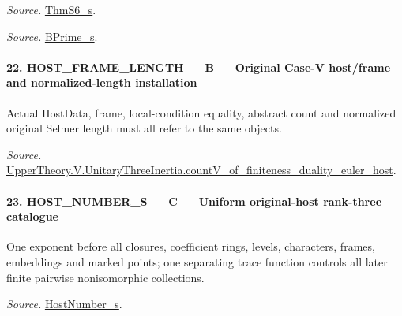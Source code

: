 \emph{Source.} \href{https://github.com/CocoSgt/riemann-hypothesis-lean/blob/7cbf7a0c32fca1badf05931879a37c3f8a2b03b4/src/Development/AutomorphicArithmetic/AutomorphicVarieties/ModularityArgument/ThresholdArguments/DenseThresholdCases/ThmS6CoreS.lean#L17-L26}{ThmS6\_\allowbreak s}.

\emph{Source.} \href{https://github.com/CocoSgt/riemann-hypothesis-lean/blob/7cbf7a0c32fca1badf05931879a37c3f8a2b03b4/src/Development/AutomorphicArithmetic/AutomorphicVarieties/ModularityArgument/ThresholdArguments/DenseThresholdCases/ThmS6CoreS.lean#L12-L16}{BPrime\_\allowbreak s}.



\paragraph{22. HOST\_\allowbreak FRAME\_\allowbreak LENGTH — B — Original Case-V host/frame and normalized-length installation}

Actual HostData, frame, local-condition equality, abstract count and normalized original Selmer length must all refer to the same objects.

\emph{Source.} \href{https://github.com/CocoSgt/riemann-hypothesis-lean/blob/7cbf7a0c32fca1badf05931879a37c3f8a2b03b4/src/Development/AutomorphicArithmetic/AutomorphicVarieties/ModularityArgument/ThresholdArguments/DenseThresholdCases/CountVOf.lean#L33-L60}{UpperTheory.V.UnitaryThreeInertia.countV\_\allowbreak of\_\allowbreak finiteness\_\allowbreak duality\_\allowbreak euler\_\allowbreak host}.



\paragraph{23. HOST\_\allowbreak NUMBER\_\allowbreak S — C — Uniform original-host rank-three catalogue}

One exponent before all closures, coefficient rings, levels, characters, frames, embeddings and marked points; one separating trace function controls all later finite pairwise nonisomorphic collections.

\emph{Source.} \href{https://github.com/CocoSgt/riemann-hypothesis-lean/blob/7cbf7a0c32fca1badf05931879a37c3f8a2b03b4/src/Development/AutomorphicArithmetic/AutomorphicVarieties/ModularityArgument/ThresholdArguments/DenseThresholdCases/HostNumberS.lean#L18-L28}{HostNumber\_\allowbreak s}.



